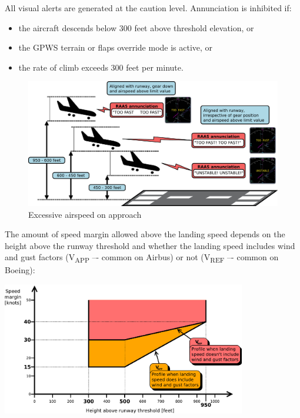 \documentclass[a4paper,12pt]{article}
\begin{document}
\noindent All visual alerts are generated at the caution level.
Annunciation is inhibited if:

\begin{itemize}

\item the aircraft descends below 300 feet above threshold elevation, or

\item the GPWS terrain or flaps override mode is active, or

\item the rate of climb exceeds 300 feet per minute.

\end{itemize}

\begin{figure}[H]
\begin{center}
\includegraphics[width=\textwidth]{../src/apch_too_fast.pdf}
\end{center}
\caption{Excessive airspeed on approach}
\end{figure}

\noindent The amount of speed margin allowed above the landing speed
depends on the height above the runway threshold and whether the landing
speed includes wind and gust factors (V\textsubscript{APP} –- common on
Airbus) or not (V\textsubscript{REF} –- common on Boeing):

\begin{center}
\includegraphics[width=0.8\textwidth]{../src/spd_table.pdf}
\end{center}
\end{document}
